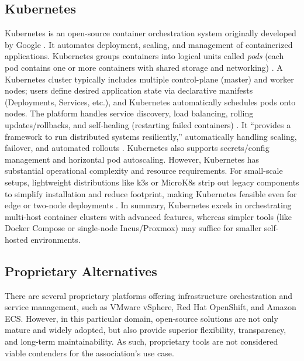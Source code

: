 \subsection{Kubernetes}

Kubernetes is an open-source container orchestration system originally developed by Google \cite{KubernetesHome2023}. It automates deployment, scaling, and management of containerized applications. Kubernetes groups containers into logical units called \emph{pods} (each pod contains one or more containers with shared storage and networking) \cite{KubernetesHome2023}\cite{KubernetesPods2025}. A Kubernetes cluster typically includes multiple control-plane (master) and worker nodes; users define desired application state via declarative manifests (Deployments, Services, etc.), and Kubernetes automatically schedules pods onto nodes. The platform handles service discovery, load balancing, rolling updates/rollbacks, and self-healing (restarting failed containers) \cite{KubernetesDocs2025}. It “provides a framework to run distributed systems resiliently,” automatically handling scaling, failover, and automated rollouts \cite{KubernetesDocs2025}. Kubernetes also supports secrets/config management and horizontal pod autoscaling. However, Kubernetes has substantial operational complexity and resource requirements. For small-scale setups, lightweight distributions like k3s or MicroK8s strip out legacy components to simplify installation and reduce footprint, making Kubernetes feasible even for edge or two-node deployments \cite{K3sMicroK8s2022}. In summary, Kubernetes excels in orchestrating multi-host container clusters with advanced features, whereas simpler tools (like Docker Compose or single-node Incus/Proxmox) may suffice for smaller self-hosted environments.

\subsection{Proprietary Alternatives}

There are several proprietary platforms offering infrastructure orchestration and service management, such as VMware vSphere, Red Hat OpenShift, and Amazon ECS. However, in this particular domain, open-source solutions are not only mature and widely adopted, but also provide superior flexibility, transparency, and long-term maintainability. As such, proprietary tools are not considered viable contenders for the association's use case.
